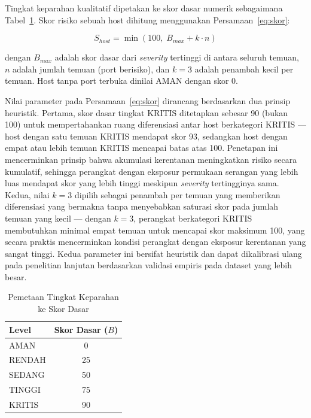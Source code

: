 Tingkat keparahan kualitatif dipetakan ke skor dasar numerik
sebagaimana Tabel~\ref{tab:severity}. Skor risiko sebuah host dihitung
menggunakan Persamaan~\eqref{eq:skor}:

\begin{equation}
    S_{host} = \min\!\left(100,\; B_{max} + k \cdot n \right)
    \label{eq:skor}
\end{equation}

\noindent dengan $B_{max}$ adalah skor dasar dari \textit{severity}
tertinggi di antara seluruh temuan, $n$ adalah jumlah temuan (port
berisiko), dan $k = 3$ adalah penambah kecil per temuan. Host tanpa port
terbuka dinilai AMAN dengan skor 0.

Nilai parameter pada Persamaan~\eqref{eq:skor} dirancang berdasarkan dua
prinsip heuristik. Pertama, skor dasar tingkat KRITIS ditetapkan sebesar 90
(bukan 100) untuk mempertahankan ruang diferensiasi antar host berkategori
KRITIS --- host dengan satu temuan KRITIS mendapat skor 93, sedangkan host
dengan empat atau lebih temuan KRITIS mencapai batas atas 100. Penetapan ini
mencerminkan prinsip bahwa akumulasi kerentanan meningkatkan risiko secara
kumulatif, sehingga perangkat dengan eksposur permukaan serangan yang lebih
luas mendapat skor yang lebih tinggi meskipun \textit{severity} tertingginya
sama. Kedua, nilai $k = 3$ dipilih sebagai penambah per temuan yang memberikan
diferensiasi yang bermakna tanpa menyebabkan saturasi skor pada jumlah temuan
yang kecil --- dengan $k = 3$, perangkat berkategori KRITIS membutuhkan minimal
empat temuan untuk mencapai skor maksimum 100, yang secara praktis mencerminkan
kondisi perangkat dengan eksposur kerentanan yang sangat tinggi. Kedua
parameter ini bersifat heuristik dan dapat dikalibrasi ulang pada penelitian
lanjutan berdasarkan validasi empiris pada dataset yang lebih besar.

\begin{table}[ht]
    \centering
    \caption{Pemetaan Tingkat Keparahan ke Skor Dasar}
    \label{tab:severity}
    \begin{tabular}{|l|c|}
        \hline
        \textbf{Level} & \textbf{Skor Dasar ($B$)} \\
        \hline
        AMAN & 0 \\
        RENDAH & 25 \\
        SEDANG & 50 \\
        TINGGI & 75 \\
        KRITIS & 90 \\
        \hline
    \end{tabular}
\end{table}

